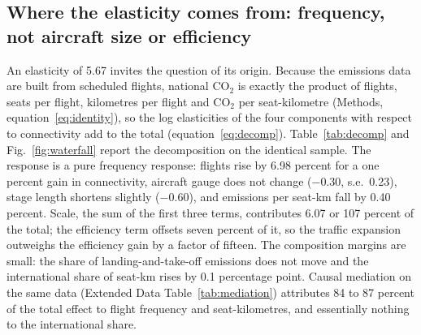 \documentclass[12pt]{article}
\begin{document}
\subsection*{Where the elasticity comes from: frequency, not aircraft size
or efficiency}
An elasticity of 5.67 invites the question of its origin. Because the
emissions data are built from scheduled flights, national CO$_2$ is
exactly the product of flights, seats per flight, kilometres per flight and
CO$_2$ per seat-kilometre (Methods, equation~\ref{eq:identity}), so the
log elasticities of the four components with respect to connectivity add
to the total (equation~\ref{eq:decomp}). Table~\ref{tab:decomp} and
Fig.~\ref{fig:waterfall} report the decomposition on the identical sample.
The response is a pure frequency response: flights rise by 6.98 percent for
a one percent gain in connectivity, aircraft gauge does not change
($-0.30$, s.e.\ 0.23), stage length shortens slightly ($-0.60$), and
emissions per seat-km fall by 0.40 percent. Scale, the sum of the first
three terms, contributes 6.07 or 107 percent of the total; the efficiency
term offsets seven percent of it, so the traffic expansion outweighs the
efficiency gain by a factor of fifteen. The composition margins are small:
the share of landing-and-take-off emissions does not move and the
international share of seat-km rises by 0.1 percentage point. Causal
mediation on the same data (Extended Data Table~\ref{tab:mediation})
attributes 84 to 87 percent of the total effect to flight frequency and
seat-kilometres, and essentially nothing to the international share.
\end{document}
